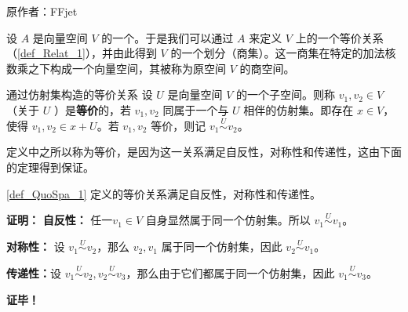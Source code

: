 
\begin{issues}
\issueDraft
\end{issues}


原作者：FFjet


设 $A$ 是向量空间 $V$ 的一个。于是我们可以通过 $A$ 来定义 $V$ 上的一个等价关系（\autoref{def_Relat_1}），并由此得到 $V$ 的一个划分（商集）。这一商集在特定的加法核数乘之下构成一个向量空间，其被称为原空间 $V$ 的商空间。



\begin{definition}{通过仿射集构造的等价关系}\label{def_QuoSpa_1}
设 $U$ 是向量空间 $V$ 的一个子空间。则称 $v_1,v_2\in V$ （关于 $U$ ）是\textbf{等价}的，若 $v_1,v_2$ 同属于一个与 $U$ 相伴的仿射集。即存在 $x\in V$，使得 $v_1,v_2\in x+U$。若 $v_1,v_2$ 等价，则记 $v_1\overset{U}{\sim}v_2$。 
\end{definition}
定义中之所以称为等价，是因为这一关系满足自反性，对称性和传递性，这由下面的定理得到保证。
\begin{theorem}{}
\autoref{def_QuoSpa_1} 定义的等价关系满足自反性，对称性和传递性。
\end{theorem}

\textbf{证明：}
\textbf{自反性：} 任一$v_1\in V$ 自身显然属于同一个仿射集。所以 $v_1\overset{U}{\sim} v_1$。

\textbf{对称性：} 设 $v_1\overset{U}{\sim} v_2$，那么 $v_2,v_1$ 属于同一个仿射集，因此 $v_2\overset{U}{\sim} v_1$。


\textbf{传递性：}设 $v_1\overset{U}{\sim} v_2,v_2\overset{U}{\sim} v_3$，那么由于它们都属于同一个仿射集，因此 $v_1\overset{U}{\sim} v_3$。

\textbf{证毕！}




